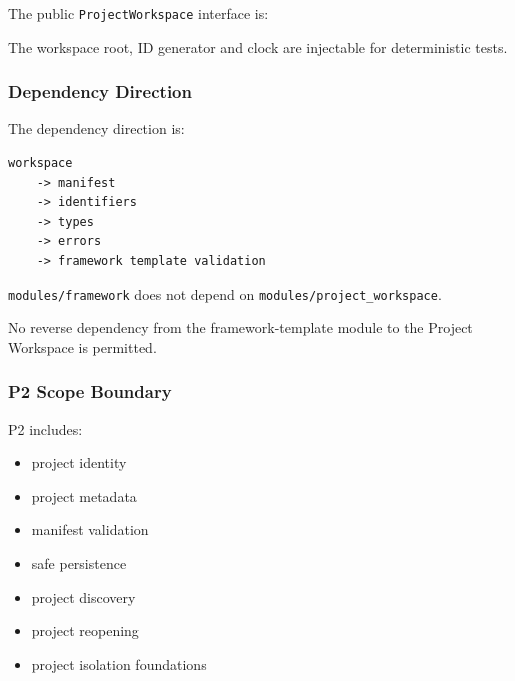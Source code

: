 The public \texttt{ProjectWorkspace} interface is:

\begin{Shaded}
\begin{Highlighting}[]
\OperatorTok{=}\NormalTok{)}
    \OperatorTok{*}\NormalTok{,}
\OperatorTok{=}\NormalTok{,}
\OperatorTok{=}\NormalTok{,}
\NormalTok{)}
\end{Highlighting}
\end{Shaded}

The workspace root, ID generator and clock are injectable for deterministic tests.

\hypertarget{dependency-direction}{%
\subsubsection{Dependency Direction}\label{dependency-direction}}

The dependency direction is:

\begin{verbatim}
workspace
    -> manifest
    -> identifiers
    -> types
    -> errors
    -> framework template validation
\end{verbatim}

\texttt{modules/framework} does not depend on \texttt{modules/project\_workspace}.

No reverse dependency from the framework-template module to the Project Workspace is permitted.

\hypertarget{p2-scope-boundary}{%
\subsubsection{P2 Scope Boundary}\label{p2-scope-boundary}}

P2 includes:

\begin{itemize}
\tightlist
\item
  project identity
\item
  project metadata
\item
  manifest validation
\item
  safe persistence
\item
  project discovery
\item
  project reopening
\item
  project isolation foundations
\end{itemize}

